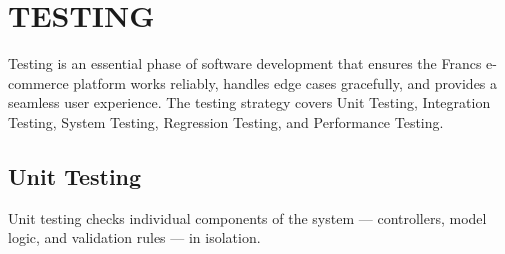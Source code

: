 \chapter{TESTING}

Testing is an essential phase of software development that ensures the Francs e-commerce platform works reliably, handles edge cases gracefully, and provides a seamless user experience. The testing strategy covers Unit Testing, Integration Testing, System Testing, Regression Testing, and Performance Testing.

\section{Unit Testing}
Unit testing checks individual components of the system --- controllers, model logic, and validation rules --- in isolation.

